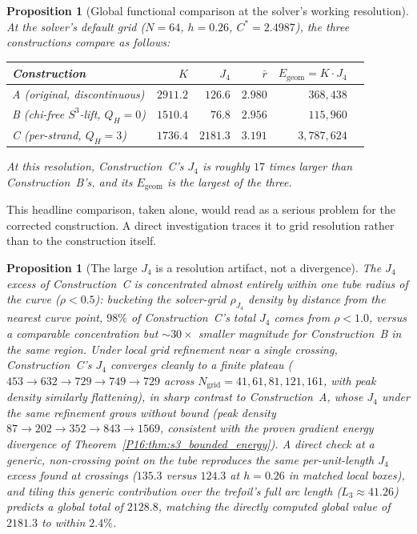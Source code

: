 \documentclass[11pt,a4paper]{article}
\newtheorem{proposition}[theorem]{Proposition}
\theoremstyle{definition}\newtheorem{definition}[theorem]{Definition}
\theoremstyle{remark}
\theoremstyle{definition}\newtheorem{construction}[theorem]{Construction}
\newcommand{\QH}{Q_H}
\begin{document}
\begin{proposition}[Global functional comparison at the solver's
  working resolution]
\label{P16:prop:global_functional_comparison}
At the solver's default grid ($N=64$, $h=0.26$, $C^*=2.4987$), the
three constructions compare as follows:
\begin{center}
\renewcommand{\arraystretch}{1.2}
\begin{tabular}{lrrrrr}
\toprule
Construction & $K$ & $J_4$ & $\bar r$ & $E_{\mathrm{geom}}=K\!\cdot\!J_4$ \\
\midrule
A (original, discontinuous)     & $2911.2$ & $126.6$  & $2.980$ & $368{,}438$ \\
B (chi-free $S^3$-lift, $\QH=0$) & $1510.4$ & $76.8$   & $2.956$ & $115{,}960$ \\
C (per-strand, $\QH=3$)          & $1736.4$ & $2181.3$ & $3.191$ & $3{,}787{,}624$ \\
\bottomrule
\end{tabular}
\end{center}
At this resolution, Construction~C's $J_4$ is roughly $17$ times
larger than Construction~B's, and its $E_{\mathrm{geom}}$ is the
largest of the three.
\end{proposition}

This headline comparison, taken alone, would read as a serious
problem for the corrected construction. A direct investigation traces
it to grid resolution rather than to the construction itself.

\begin{proposition}[The large $J_4$ is a resolution artifact, not a
  divergence]
\label{P16:prop:j4_resolution_artifact}
The $J_4$ excess of Construction~C is concentrated almost entirely
within one tube radius of the curve ($\rho<0.5$): bucketing the
solver-grid $\rho_{J_4}$ density by distance from the nearest curve
point, $98\%$ of Construction~C's total $J_4$ comes from $\rho<1.0$,
versus a comparable concentration but $\sim30\times$ smaller magnitude
for Construction~B in the same region. Under local grid refinement
near a single crossing, Construction~C's $J_4$ converges cleanly to a
finite plateau ($453\to632\to729\to749\to729$ across
$N_{\mathrm{grid}}=41,61,81,121,161$, with peak density similarly
flattening), in sharp contrast to Construction~A, whose $J_4$ under
the same refinement grows without bound (peak density
$87\to202\to352\to843\to1569$, consistent with the proven gradient
energy divergence of Theorem~\ref{P16:thm:s3_bounded_energy}). A direct
check at a generic, non-crossing point on the tube reproduces the same
per-unit-length $J_4$ excess found at crossings ($135.3$ versus $124.3$
at $h=0.26$ in matched local boxes), and tiling this generic
contribution over the trefoil's full arc length
($L_3\approx41.26$) predicts a global total of $2128.8$, matching the
directly computed global value of $2181.3$ to within $2.4\%$.
\end{proposition}
\end{document}

